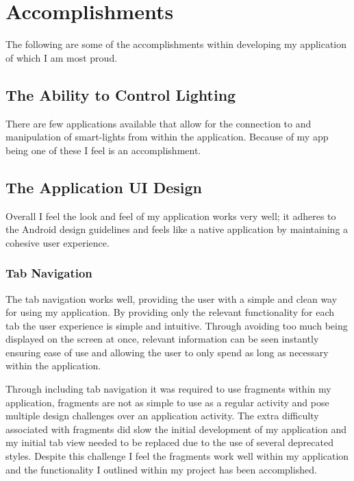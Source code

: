 \section{Accomplishments}\label{accomplishments}

The following are some of the accomplishments within developing my
application of which I am most proud.

\subsection{The Ability to Control
Lighting}\label{the-ability-to-control-lighting}

There are few applications available that allow for the connection to
and manipulation of smart-lights from within the application. Because of
my app being one of these I feel is an accomplishment.

\subsection{The Application UI Design}\label{the-application-ui-design}

Overall I feel the look and feel of my application works very well; it
adheres to the Android design guidelines \parencite{androiddesign} and
feels like a native application by maintaining a cohesive user
experience.

\subsubsection{Tab Navigation}\label{tab-navigation}

The tab navigation works well, providing the user with a simple and
clean way for using my application. By providing only the relevant
functionality for each tab the user experience is simple and intuitive.
Through avoiding too much being displayed on the screen at once,
relevant information can be seen instantly ensuring ease of use and
allowing the user to only spend as long as necessary within the
application.

Through including tab navigation it was required to use fragments within
my application, fragments are not as simple to use as a regular activity
and pose multiple design challenges over an application activity. The
extra difficulty associated with fragments did slow the initial
development of my application and my initial tab view needed to be
replaced due to the use of several deprecated styles. Despite this
challenge I feel the fragments work well within my application and the
functionality I outlined within my project has been accomplished.


